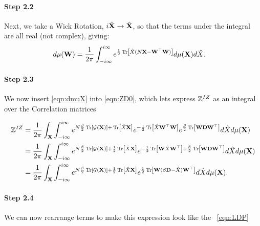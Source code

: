 \paragraph{Step 2.2}
Next, we take a Wick Rotation, $i\hat{\mathbf{X}}\rightarrow \hat{\mathbf{X}}$, so that the terms under the integral are all real (not complex), giving:
\begin{align}
  \label{eqn:dmuX}
  d\mu(\mathbf{W}) &= \frac{1}{2\pi}\int_{-i\infty}^{i\infty} e^{\frac{1}{2}\mbox{}\operatorname{Tr}\left[\hat{X}(N\mathbf{X}-\mathbf{W}^{\top}\mathbf{W})\right]} d\mu(\mathbf{X})d\hat{X}  .
\end{align}

\paragraph{Step 2.3}
We now insert \ref{eqn:dmuX} into \ref{eqn:ZD0}, which lets
express $\mathbb{Z}^{IZ}$ as an integral over the \Teacher Correlation matrices

\begin{align}
  \nonumber
  \mathbb{Z}^{IZ}&=
  \frac{1}{2\pi} \int_{\mathbf{X}}  \int_{-i\infty}^{i\infty}
  e^{N\frac{\beta}{2} \mbox{}\operatorname{Tr}\left[\mathcal{G}(\mathbf{X})\right]+\mbox{}\operatorname{Tr}\left[\hat{X}\mathbf{X}\right] }
  e^{-\frac{1}{2}\mbox{}\operatorname{Tr}\left[\hat{X}\mathbf{W}^{\top}\mathbf{W}\right]}
  e^{\frac{\beta}{2}\mbox{}\operatorname{Tr}\left[\mathbf{W}\mathbf{D}\mathbf{W}^{\top}\right]}
  d\hat{X}  
  d\mu(\mathbf{\mathbf{X}}) \\ 
  \nonumber
  &=
  \frac{1}{2\pi} \int_{\mathbf{X}}  \int_{-i\infty}^{i\infty}
  e^{N\frac{\beta}{2}\mbox{}\operatorname{Tr}\left[\mathcal{G}(\mathbf{X})\right]+ \frac{1}{2}\mbox{}\operatorname{Tr}\left[\hat{X}\mathbf{X}\right]}
  e^{-\frac{1}{2}\mbox{}\operatorname{Tr}\left[\mathbf{W}\hat{X}\mathbf{W}^{\top}\right]+
  \frac{\beta}{2}\mbox{}\operatorname{Tr}\left[\mathbf{W}\mathbf{D}\mathbf{W}^{\top}\right]}
  d\hat{X}  
  d\mu(\mathbf{\mathbf{X}}) \\ 
  \label{eqn:ZD3}
    &=
  \frac{1}{2\pi} \int_{\mathbf{X}}  \int_{-i\infty}^{i\infty}
  e^{N\frac{\beta}{2}\mbox{}\operatorname{Tr}\left[\mathcal{G}(\mathbf{X})\right]+
  \frac{1}{2}\mbox{}\operatorname{Tr}\left[\hat{X}\mathbf{X}\right]}
  e^{\frac{1}{2}\mbox{}\operatorname{Tr}\left[\mathbf{W}(\beta\mathbf{D}-\hat{X})\mathbf{W}^{\top}\right]}
  d\hat{X}  
  d\mu(\mathbf{\mathbf{X}})  .
\end{align}

\paragraph{Step 2.4}
We can now rearrange terms to make this expression look like the \EQN~\ref{eqn:LDP}


